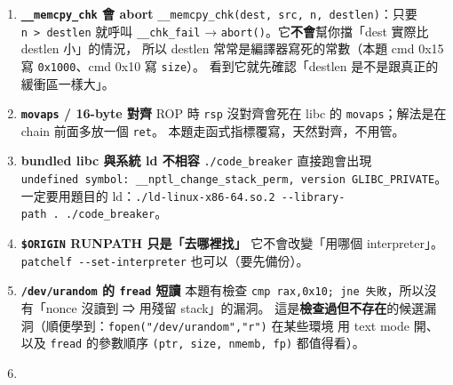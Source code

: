 \documentclass[10pt,a4paper]{article}
\begin{document}
\begin{enumerate}
\def\labelenumi{\arabic{enumi}.}
\item
  \textbf{\texttt{\_\allowbreak{}\_\allowbreak{}memcpy\_\allowbreak{}chk} 會 abort}
  \texttt{\_\allowbreak{}\_\allowbreak{}memcpy\_\allowbreak{}chk(dest,\allowbreak{}\ \allowbreak{}src,\allowbreak{}\ \allowbreak{}n,\allowbreak{}\ \allowbreak{}destlen)}：只要
  \texttt{n\ \allowbreak{}\textgreater{}\allowbreak{}\ \allowbreak{}destlen} 就呼叫 \texttt{\_\allowbreak{}\_\allowbreak{}chk\_\allowbreak{}fail} →
  \texttt{abort()}。它\textbf{不會}幫你擋「dest 實際比 destlen
  小」的情況， 所以 destlen 常常是編譯器寫死的常數（本題 cmd 0x15 寫
  \texttt{0x1000}、cmd 0x10 寫 \texttt{size}）。 看到它就先確認「destlen
  是不是跟真正的緩衝區一樣大」。
\item
  \textbf{\texttt{movaps} / 16-byte 對齊} ROP 時 \texttt{rsp}
  沒對齊會死在 libc 的 \texttt{movaps}；解法是在 chain 前面多放一個
  \texttt{ret}。 本題走函式指標覆寫，天然對齊，不用管。
\item
  \textbf{bundled libc 與系統 ld 不相容} \texttt{./\allowbreak{}code\_\allowbreak{}breaker}
  直接跑會出現
  \texttt{undefined\ \allowbreak{}symbol:\allowbreak{}\ \allowbreak{}\_\allowbreak{}\_\allowbreak{}nptl\_\allowbreak{}change\_\allowbreak{}stack\_\allowbreak{}perm,\allowbreak{}\ \allowbreak{}version\ \allowbreak{}GLIBC\_\allowbreak{}PRIVATE}。
  一定要用題目的
  ld：\texttt{./\allowbreak{}ld-\allowbreak{}linux-\allowbreak{}x86-\allowbreak{}64.\allowbreak{}so.\allowbreak{}2\ \allowbreak{}-\allowbreak{}\/\allowbreak{}-\allowbreak{}library-\allowbreak{}path\ \allowbreak{}.\allowbreak{}\ \allowbreak{}./\allowbreak{}code\_\allowbreak{}breaker}。
\item
  \textbf{\texttt{\$\allowbreak{}ORIGIN} RUNPATH 只是「去哪裡找」} 它不會改變「用哪個
  interpreter」。\texttt{patchelf\ \allowbreak{}-\allowbreak{}\/\allowbreak{}-\allowbreak{}set-\allowbreak{}interpreter}
  也可以（要先備份）。
\item
  \textbf{\texttt{/\allowbreak{}dev/\allowbreak{}urandom} 的 \texttt{fread} 短讀} 本題有檢查
  \texttt{cmp\ \allowbreak{}rax,\allowbreak{}0x10;\ \allowbreak{}jne\ \allowbreak{}失敗}，所以沒有「nonce 沒讀到 ⇒ 用殘留
  stack」的漏洞。
  這是\textbf{檢查過但不存在}的候選漏洞（順便學到：\texttt{fopen("/\allowbreak{}dev/\allowbreak{}urandom","r")}
  在某些環境 用 text mode 開、以及 \texttt{fread} 的參數順序
  \texttt{(ptr,\allowbreak{}\ \allowbreak{}size,\allowbreak{}\ \allowbreak{}nmemb,\allowbreak{}\ \allowbreak{}fp)} 都值得看）。
\item

\end{enumerate}
\end{document}
